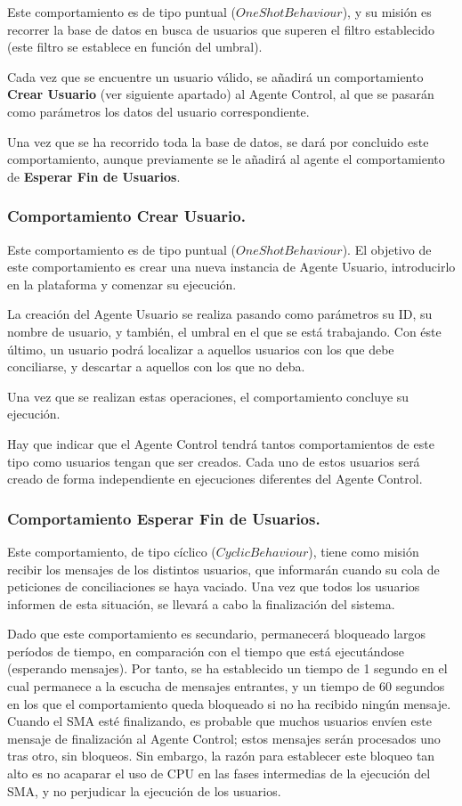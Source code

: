 Este comportamiento es de tipo puntual ($OneShotBehaviour$), y su misión es recorrer la base de datos en busca de usuarios que superen el filtro establecido (este filtro se establece en función del umbral).

Cada vez que se encuentre un usuario válido, se añadirá un comportamiento {\bf Crear Usuario} (ver siguiente apartado) al Agente Control, al que se pasarán como parámetros los datos del usuario correspondiente.

Una vez que se ha recorrido toda la base de datos, se dará por concluido este comportamiento, aunque previamente se le añadirá al agente el comportamiento de {\bf Esperar Fin de Usuarios}.

\subsubsection{Comportamiento Crear Usuario.}

Este comportamiento es de tipo puntual ($OneShotBehaviour$). El objetivo de este comportamiento es crear una nueva instancia de Agente Usuario, introducirlo en la plataforma y comenzar su ejecución.

La creación del Agente Usuario se realiza pasando como parámetros su ID, su nombre de usuario, y también, el umbral en el que se está trabajando. Con éste último, un usuario podrá localizar a aquellos usuarios con los que debe conciliarse, y descartar a aquellos con los que no deba.

Una vez que se realizan estas operaciones, el comportamiento concluye su ejecución.

Hay que indicar que el Agente Control tendrá tantos comportamientos de este tipo como usuarios tengan que ser creados. Cada uno de estos usuarios será creado de forma independiente en ejecuciones diferentes del Agente Control.

\subsubsection{Comportamiento Esperar Fin de Usuarios.}

Este comportamiento, de tipo cíclico ($CyclicBehaviour$), tiene como misión recibir los mensajes de los distintos usuarios, que informarán cuando su cola de peticiones de conciliaciones se haya vaciado. Una vez que todos los usuarios informen de esta situación, se llevará a cabo la finalización del sistema.

Dado que este comportamiento es secundario, permanecerá bloqueado largos períodos de tiempo, en comparación con el tiempo que está ejecutándose (esperando mensajes). Por tanto, se ha establecido un tiempo de 1 segundo en el cual permanece a la escucha de mensajes entrantes, y un tiempo de 60 segundos en los que el comportamiento queda bloqueado si no ha recibido ningún mensaje. Cuando el SMA esté finalizando, es probable que muchos usuarios envíen este mensaje de finalización al Agente Control; estos mensajes serán procesados uno tras otro, sin bloqueos. Sin embargo, la razón para establecer este bloqueo tan alto es no acaparar el uso de CPU en las fases intermedias de la ejecución del SMA, y no perjudicar la ejecución de los usuarios.

